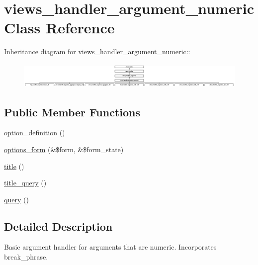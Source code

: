 \hypertarget{classviews__handler__argument__numeric}{
\section{views\_\-handler\_\-argument\_\-numeric Class Reference}
\label{classviews__handler__argument__numeric}
}
Inheritance diagram for views\_\-handler\_\-argument\_\-numeric::\begin{figure}[H]
\begin{center}
\leavevmode
\includegraphics[height=1.28617cm]{classviews__handler__argument__numeric}
\end{center}
\end{figure}
\subsection*{Public Member Functions}
\begin{CompactItemize}
\item 
\hyperlink{classviews__handler__argument__numeric_d2b7dc4afcf4d444e18752cfbd23ec63}{option\_\-definition} ()
\item 
\hyperlink{classviews__handler__argument__numeric_b30359963ec4962258bb8db3b6a870c4}{options\_\-form} (\&\$form, \&\$form\_\-state)
\item 
\hyperlink{classviews__handler__argument__numeric_480758dbcde899b5483b091e51e2bf39}{title} ()
\item 
\hyperlink{classviews__handler__argument__numeric_5c6f566b06bad6057e92f15d82311c7b}{title\_\-query} ()
\item 
\hyperlink{classviews__handler__argument__numeric_399a3c37ef1277c6b79596fa6dd037a7}{query} ()
\end{CompactItemize}


\subsection{Detailed Description}
Basic argument handler for arguments that are numeric. Incorporates break\_\-phrase. 

